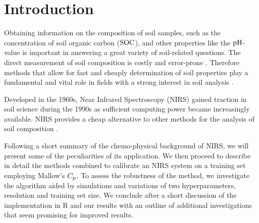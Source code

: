 \section{Introduction}
\label{sec:introduction}
	
	Obtaining information on the composition of soil samples, such as the concentration of soil organic carbon ($\mathrm{SOC}$), and other properties like the $\mathrm{pH}$-value is important in answering a great variety of soil-related questions.	
	The direct measurement of soil composition is costly and error-prone \cite[1-3]{mclaughlin:99a}.
	Therefore methods that allow for fast and cheaply determination of soil properties play a fundamental and vital role in fields with a strong interest in soil analysis \cite{ludwig:01a}.

	Developed in the 1960s, Near Infrared Spectroscopy (NIRS) gained traction in soil science during the 1990s as sufficient computing power became increasingly available.
	NIRS provides a cheap alternative to other methods for the analysis of soil composition \cite[247]{agelet:10a}.

	Following a short summary of the chemo-physical background of NIRS, we will present some of the peculiarities of its application.
	We then proceed to describe in detail the methods combined to calibrate an NIRS system on a training set employing Mallow's $C_{\mathrm{p}}$.
	To assess the robustness of the method, we investigate the algorithm aided by simulations and variations of two hyperparameters, resolution and training set size.
	We conclude after a short discussion of the implementation in \textsf{R} \cite{r-foundation:16a} and our results with an outline of additional investigations that seem promising for improved results.

